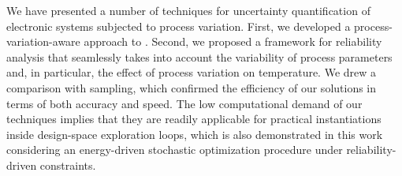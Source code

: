 We have presented a number of techniques for uncertainty quantification of electronic systems subjected to process variation.
First, we developed a process-variation-aware approach to \dssta.
Second, we proposed a framework for reliability analysis that seamlessly takes into account the variability of process parameters and, in particular, the effect of process variation on temperature.
We drew a comparison with  sampling, which confirmed the efficiency of our solutions in terms of both accuracy and speed.
The low computational demand of our techniques implies that they are readily applicable for practical instantiations inside design-space exploration loops, which is also demonstrated in this work considering an energy-driven stochastic optimization procedure under reliability-driven constraints.
